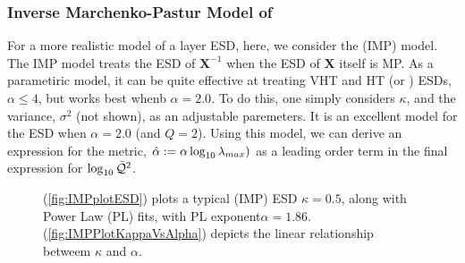 \subsubsection{Inverse Marchenko-Pastur Model of \IdealLearning}
For a more realistic model of a layer ESD, 
here, we consider the \InverseMP (IMP) model.\cite{BunThesis}
The IMP model treats the ESD of $\mathbf{X}^{-1}$ when the ESD of $\mathbf{X}$ itself is MP.
As a parametiric model, it can be quite effective at treating VHT and HT (or \FatTailed) ESDs,
$\alpha\le 4$, but works best whenb $\alpha=2.0$.
To do this, one simply considers  $\kappa$, and the variance, $\sigma^2$ (not shown), as an adjustable paremeters.
%
It is an excellent model for the ESD when $\alpha=2.0$ (and $Q=2$).
Using this model, we can derive an expression for the \HTSR \ALPHAHAT \LayerQuality metric,
$\hat\alpha :=\alpha\log_{10}\lambda_{max})$ as a leading order term in the final expression for $\log_{10}\bar{\mathcal{Q}}^{2}$.

\begin{figure}[h]
    \centering
      \caption{
        (\ref{fig:IMPplotESD}) plots a typical \InverseMP (IMP) ESD  $\kappa=0.5$,  along with Power Law (PL) fits, with PL exponent$\alpha=1.86$.
        (\ref{fig:IMPPlotKappaVsAlpha}) depicts the linear relationship betweem $\kappa$ and $\alpha$.
      }
  \label{fig:IMPplots}                                                                                                      
\end{figure}   

